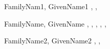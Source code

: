 \begin{theindex}

  \indexspace \item FamilyNam1, GivenName1 \dotfill {}, 
		, 
  \indexspace \item FamilyName, GivenName \dotfill {}, 
		, , , 
		, 
  \indexspace \item FamilyName2, GivenName2 \dotfill {}, 
		, 

\end{theindex}
